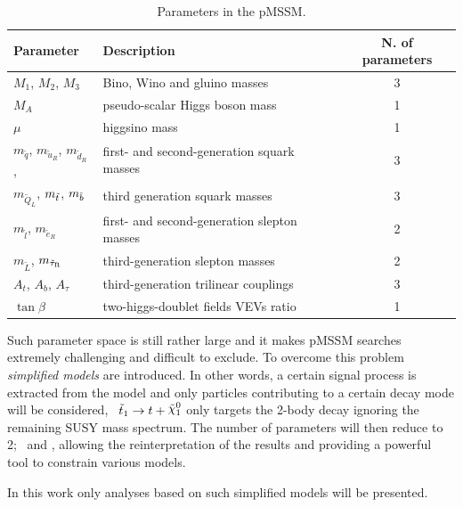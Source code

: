 				\begin{table}[!htb]\centering\caption{Parameters in the pMSSM.}
				\renewcommand{\arraystretch}{1.3}
					\begin{tabular}{llc}
					\toprule
					\textbf{Parameter} & \textbf{Description} & \textbf{N. of parameters} \\ 
					\toprule

					$M_1$, $M_2$, $M_3$ & Bino, Wino and gluino masses & 3 \\ \midrule

					$M_{A}$	& pseudo-scalar Higgs boson mass	& 1 \\\midrule
					$\mu$  & higgsino mass & 1 \\\midrule

					$m_{\tilde{q}}$, $m_{\tilde{u}_R}$, $m_{\tilde{d}_R}$, & first- and second-generation squark masses & 3 \\
					$m_{\tilde{Q}_L}$, $m_{\tilde{t}}$, $m_{\tilde{b}}$ & third generation squark masses	&  3 \\\midrule

					$m_{\tilde{l}}$, $m_{\tilde{e}_R}$ & first- and second-generation slepton masses	 & 2 \\
					$m_{\tilde{L}}$, $m_{\tilde{\tau}_{\mathrm{R}}}$ & third-generation slepton masses	& 2 \\\midrule

					$A_t$, $A_b$, $A_{\tau}$ & third-generation trilinear couplings	& 3 \\\midrule

					$\tan \beta$ & two-higgs-doublet fields \ac{VEV}s ratio & 1 \\ 
					\bottomrule
					\end{tabular}
				\label{tab:MSSM_mainFreePar} 
				\end{table}

				\noindent Such parameter space is still rather large and it makes \ac{pMSSM} searches extremely challenging and difficult to exclude. To overcome this problem \textit{simplified models} are introduced. In other words, a certain signal process is extracted from the model and only particles contributing to a certain decay mode will be considered, \eg\ $\stopone \ra t + \ninoone$ only targets the 2-body decay ignoring the remaining \ac{SUSY} mass spectrum. The number of parameters will then reduce to 2; \mstop\ and \mLSP, allowing the reinterpretation of the results and providing a powerful tool to constrain various models. 

				In this work only analyses based on such simplified models will be presented. 

